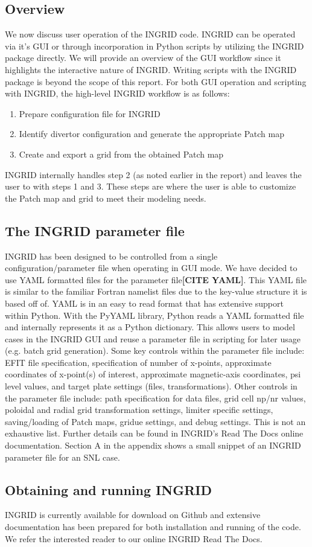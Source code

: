 \subsection{\label{sec:level2} Overview}
We now discuss user operation of the INGRID code. INGRID can be operated via it's GUI or through incorporation in Python scripts by utilizing the INGRID package directly. We will provide an overview of the GUI workflow since it highlights the interactive nature of INGRID. Writing scripts with the INGRID package is beyond the scope of this report. For both GUI operation and scripting with INGRID, the high-level INGRID workflow is as follows:
\begin{enumerate}
    \itemsep-4pt
    \item Prepare configuration file for INGRID
    \item Identify divertor configuration and generate the appropriate Patch map
    \item Create and export a grid from the obtained Patch map
\end{enumerate}
\noindent
INGRID internally handles step 2 (as noted earlier in the report) and leaves the user to with steps 1 and 3. These steps are where the user is able to customize the Patch map and grid to meet their modeling needs.

\subsection{\label{sec:level2}The INGRID parameter file}
INGRID has been designed to be controlled from a single configuration/parameter file when operating in GUI mode. We have decided to use YAML formatted files for the parameter file\textbf{[CITE YAML]}. This YAML file is similar to the familiar Fortran namelist files due to the key-value structure it is based off of. YAML is in an easy to read format that has extensive support within Python. With the PyYAML library, Python reads a YAML formatted file and internally represents it as a Python dictionary. This allows users to model cases in the INGRID GUI and reuse a parameter file in scripting for later usage (e.g. batch grid generation). Some key controls within the parameter file include: EFIT file specification, specification of number of x-points, approximate coordinates of x-point(s) of interest, approximate magnetic-axis coordinates, psi level values, and target plate settings (files, transformations). Other controls in the parameter file include: path specification for data files, grid cell np/nr values, poloidal and radial grid transformation settings, limiter specific settings, saving/loading of Patch maps, gridue settings, and debug settings. This is not an exhaustive list. Further details can be found in INGRID's Read The Docs online documentation. Section A in the appendix shows a small snippet of an INGRID parameter file for an SNL case. 

\subsection{\label{sec:level2}Obtaining and running INGRID}
INGRID is currently available for download on Github and extensive documentation has been prepared for both installation and running of the code. We refer the interested reader to our online INGRID Read The Docs.